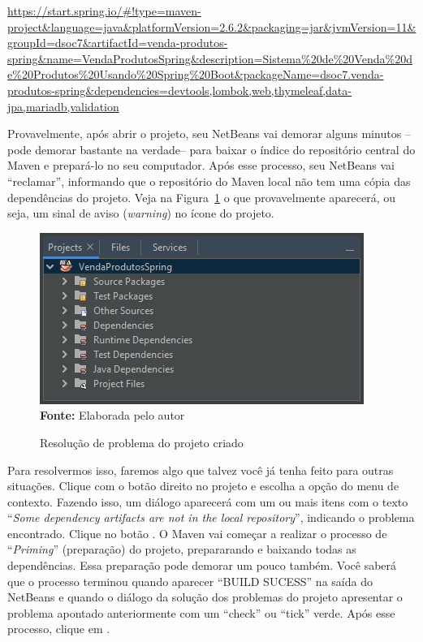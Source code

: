 \url{https://start.spring.io/#!type=maven-project&language=java&platformVersion=2.6.2&packaging=jar&jvmVersion=11&groupId=dsoc7&artifactId=venda-produtos-spring&name=VendaProdutosSpring&description=Sistema%20de%20Venda%20de%20Produtos%20Usando%20Spring%20Boot&packageName=dsoc7.venda-produtos-spring&dependencies=devtools,lombok,web,thymeleaf,data-jpa,mariadb,validation}

Provavelmente, após abrir o projeto, seu NetBeans vai demorar alguns minutos --pode demorar bastante na verdade-- para baixar o índice do repositório central do Maven e prepará-lo no seu computador. Após esse processo, seu NetBeans vai ``reclamar'', informando que o repositório do Maven local não tem uma cópia das dependências do projeto. Veja na Figura~\ref{fig:cap10ConfProjeto03} o que provavelmente aparecerá, ou seja, um sinal de aviso (\textit{warning}) no ícone do projeto.

\FloatBarrier
\begin{figure}[!htbp]
    \centering
    \caption{Resolução de problema do projeto criado}
    \includegraphics[scale=1]{imagens/cap10ConfProjeto03}
    \\\textbf{Fonte:} Elaborada pelo autor
    \label{fig:cap10ConfProjeto03}
\end{figure}
\FloatBarrier

Para resolvermos isso, faremos algo que talvez você já tenha feito para outras situações. Clique com o botão direito no projeto e escolha a opção  do menu de contexto. Fazendo isso, um diálogo aparecerá com um ou mais itens com o texto ``\textit{Some dependency artifacts are not in the local repository}'', indicando o problema encontrado. Clique no botão . O Maven vai começar a realizar o processo de ``\textit{Priming}'' (preparação) do projeto, prepararando e baixando todas as dependências. Essa preparação pode demorar um pouco também. Você saberá que o processo terminou quando aparecer ``BUILD SUCESS'' na saída do NetBeans e quando o diálogo da solução dos problemas do projeto apresentar o problema apontado anteriormente com um ``check'' ou ``tick'' verde. Após esse processo, clique em .

